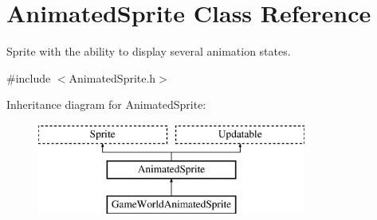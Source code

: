 \hypertarget{class_animated_sprite}{}\section{Animated\+Sprite Class Reference}
\label{class_animated_sprite}


Sprite with the ability to display several animation states.  




{\ttfamily \#include $<$Animated\+Sprite.\+h$>$}

Inheritance diagram for Animated\+Sprite\+:\begin{figure}[H]
\begin{center}
\leavevmode
\includegraphics[height=3.000000cm]{class_animated_sprite}
\end{center}
\end{figure}
